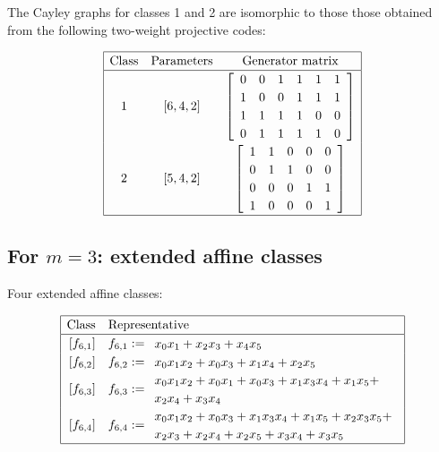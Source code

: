 \documentclass[12pt,a4paper]{article}
\begin{document}
The Cayley graphs for classes 1 and 2 are isomorphic to those those obtained from the following two-weight projective
codes:

\begin{align*}
\begin{array}{|ccc|}
\hline
\text{Class} &
\text{Parameters} & \text{Generator matrix}
\\
\hline
1 &
[6, 4, 2] & 
\left[
\begin{array}{cccccc}
0 & 0 & 1 & 1 & 1 & 1
\\
1 & 0 & 0 & 1 & 1 & 1
\\
1 & 1 & 1 & 1 & 0 & 0
\\
0 & 1 & 1 & 1 & 1 & 0
\end{array}
\right]
\\
2 &
[5, 4, 2] & 
\left[
\begin{array}{ccccc}
1 & 1 & 0 & 0 & 0
\\
0 & 1 & 1 & 0 & 0
\\
0 & 0 & 0 & 1 & 1
\\
1 & 0 & 0 & 0 & 1
\end{array}
\right]
\\
\hline
\end{array}
\end{align*}

\subsection*{For $m=3$: extended affine classes}

Four extended affine classes:

\begin{align*}
\def\arraystretch{1.2}
\begin{array}{|cl|}
\hline
\text{Class} &
\text{Representative}
\\
\hline
\,[f_{6,1}] & f_{6,1} := 
\begin{array}{l}
x_{0} x_{1} + x_{2} x_{3} + x_{4} x_{5}
\end{array}
\\
\,[f_{6,2}] & f_{6,2} := 
\begin{array}{l}
x_{0} x_{1} x_{2} + x_{0} x_{3} + x_{1} x_{4} + x_{2} x_{5}
\end{array}
\\
\,[f_{6,3}] & f_{6,3} := 
\begin{array}{l}
x_{0} x_{1} x_{2} + x_{0} x_{1} + x_{0} x_{3} + x_{1} x_{3} x_{4} + x_{1} x_{5} + 
\\
x_{2} x_{4} + x_{3} x_{4}
\end{array}
\\
\,[f_{6,4}] & f_{6,4} := 
\begin{array}{l}
x_{0} x_{1} x_{2} + x_{0} x_{3} + x_{1} x_{3} x_{4} + x_{1} x_{5} + x_{2} x_{3} x_{5} + 
\\
x_{2} x_{3} + x_{2} x_{4} + x_{2} x_{5} + x_{3} x_{4} + x_{3} x_{5}
\end{array}
\\
\hline
\end{array}
\end{align*}
\end{document}
